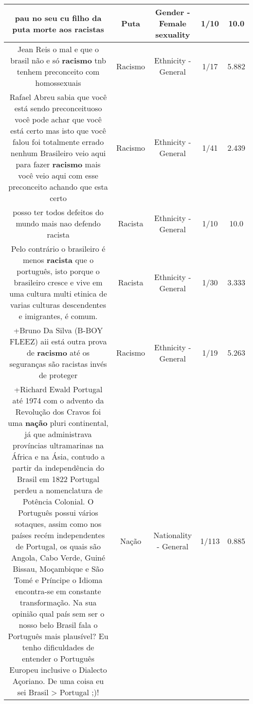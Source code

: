 \documentclass[11pt]{article}
\newlength\mylength
\begin{document}
\begin{center}
\begin{longtable}{|C{.65\mylength}|C{.30\mylength}|C{.12\mylength}|C{.12\mylength}|C{.12\mylength}|}
  \small pau no seu cu filho da \textbf{puta} morte aos racistas\normalsize   & Puta & Gender - Female sexuality & 1/10 & 10.0 \\  \hline
  \small Jean Reis o mal e que o brasil não e só \textbf{racismo} tnb tenhem preconceito com homossexuais\normalsize   & Racismo & Ethnicity - General & 1/17 & 5.882 \\  \hline
  \small Rafael Abreu sabia que você está sendo preconceituoso você pode achar que você está certo mas isto que você falou foi totalmente errado nenhum Brasileiro veio aqui para fazer \textbf{racismo} mais você veio aqui com esse preconceito achando que esta certo\normalsize   & Racismo & Ethnicity - General & 1/41 & 2.439 \\  \hline
  \small posso ter todos defeitos do mundo mais nao defendo racista\normalsize   & Racista & Ethnicity - General & 1/10 & 10.0 \\  \hline
  \small Pelo contrário o brasileiro é menos \textbf{racista} que o português, isto porque  o brasileiro cresce e vive em uma cultura multi etinica de varias culturas descendentes e imigrantes, é comum.\normalsize   & Racista & Ethnicity - General & 1/30 & 3.333 \\  \hline
  \small +Bruno Da Silva (B-BOY FLEEZ) aii está outra prova de \textbf{racismo} até os seguranças são racistas invés de proteger\normalsize   & Racismo & Ethnicity - General & 1/19 & 5.263 \\  \hline
  \small +Richard Ewald Portugal até 1974 com o advento da Revolução dos Cravos foi uma \textbf{nação} pluri continental, já que administrava províncias ultramarinas na África e na Ásia, contudo a partir da independência do Brasil em 1822 Portugal perdeu a nomenclatura de Potência Colonial. O Português possui vários sotaques, assim como nos países recém independentes de Portugal, os quais são Angola, Cabo Verde, Guiné Bissau, Moçambique e São Tomé e Príncipe o Idioma encontra-se em constante transformação. Na sua opinião qual país sem ser o nosso belo Brasil fala o Português mais plausível? Eu tenho dificuldades de entender o Português Europeu inclusive o Dialecto Açoriano. De uma coisa eu sei Brasil > Portugal ;)!\normalsize   & Nação & Nationality - General & 1/113 & 0.885 \\  \hline

\end{longtable}
\end{center}
\end{document}
